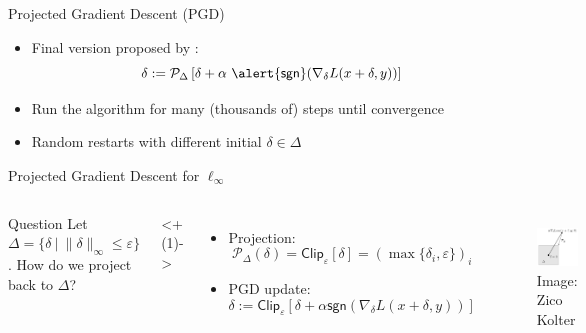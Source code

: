 \documentclass[10pt]{beamer}
\begin{document}
\begin{frame}{Projected Gradient Descent (PGD)}

  \begin{itemize}[<+->]
    \item Final version proposed by \citet{MadryMSTV17}:
    \[
      \delta := \mathcal{P}_\Delta
        \left[ \delta + \alpha \ \alert{\textsf{sgn}}(\nabla_\delta L(x + \delta, y))\right]
    \]
    \item Run the algorithm for many (thousands of) steps until convergence
    \item Random restarts with different initial $\delta \in \Delta$
  \end{itemize}

\end{frame}


\begin{frame}{Projected Gradient Descent for $\ell_\infty$}
  \begin{columns}[T,onlytextwidth]

    \begin{alertblock}{Question}
      Let $\Delta = \{ \delta ~|~ \parallel \delta \parallel_{\infty} \leq \varepsilon \}$.
      How do we project back to $\Delta$?
    \end{alertblock}

    \visible<+(1)->{
    \begin{itemize}[<+->]
      \item Projection:
        \[
          \mathcal{P}_\Delta(\delta) = \textsf{Clip}_\varepsilon[ \delta ] =
          (\max\{\delta_i, \varepsilon\})_i
        \]
      \item PGD update:
      \[
        \delta := \textsf{Clip}_\varepsilon
        \left[ \delta + \alpha \textsf{sgn} (\nabla_\delta L(x + \delta, y)) \right]
      \]
    \end{itemize}
    }

      \begin{figure}
      \centering
      \includegraphics[width=1.5in]{projected_linf.png}
      \\
      {\footnotesize Image: Zico Kolter}
      \end{figure}

  \end{columns}
\end{frame}
\end{document}
